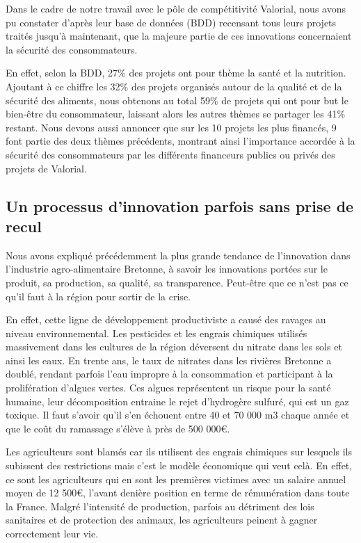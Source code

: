 \documentclass[a4paper,12pt]{report}
\begin{document}
			Dans le cadre de notre travail avec le pôle de compétitivité Valorial, nous avons pu constater d’après leur base de données (BDD) recensant tous leurs projets traités jusqu’à maintenant, que la majeure partie de ces innovations concernaient la sécurité des consommateurs. 
			
			En effet, selon la BDD, 27\% des projets ont pour thème la santé et la nutrition. Ajoutant à ce chiffre les 32\% des projets  organisés autour de la qualité et de la sécurité des aliments, nous obtenons au total 59\% de projets qui ont pour but le bien-être du consommateur, laissant alors les autres thèmes se partager les 41\% restant. Nous devons aussi annoncer que sur les 10 projets les plus financés, 9 font partie des deux thèmes précédents, montrant ainsi l’importance accordée à la sécurité des consommateurs par les différents financeurs publics ou privés des projets de Valorial.
						
		\subsection{Un processus d'innovation parfois sans prise de recul}
			
			Nous avons expliqué précédemment la plus grande tendance de l’innovation dans l’industrie agro-alimentaire Bretonne, à savoir les innovations portées sur le produit, sa production, sa qualité, sa transparence. Peut-être que ce n’est pas ce qu’il faut à la région pour sortir de la crise.
			
			En effet, cette ligne de développement productiviste a causé des ravages au niveau environnemental. Les pesticides et les engrais chimiques utilisés massivement dans les cultures de la région déversent du nitrate dans les sols et ainsi les eaux. En trente ans, le taux de nitrates dans les rivières Bretonne a doublé, rendant parfois l’eau impropre à la consommation et participant à la prolifération d’algues vertes\cite{NitratesAlguesVertesBretagne}. Ces algues représentent un risque pour la santé humaine, leur décomposition entraine le rejet d’hydrogère sulfuré, qui est un gaz toxique. Il faut s’avoir qu’il s’en échouent entre 40 et 70 000 m3 chaque année et que le coût du ramassage s’élève à près de 500 000\euro.
			
			Les agriculteurs sont blamés car ils utilisent des engrais chimiques sur lesquels ils subissent des restrictions mais c’est le modèle économique qui veut celà. En effet, ce sont les agriculteurs qui en sont les premières victimes avec un salaire annuel moyen de 12 500\euro, l’avant denière position en terme de rémunération dans toute la France\cite{AlguesVertesNouvellePreuveRavagesProductivismeAgricole}. Malgré l’intensité de production, parfois au détriment des lois sanitaires et de protection des animaux, les agriculteurs peinent à gagner correctement leur vie.
			
\end{document}
